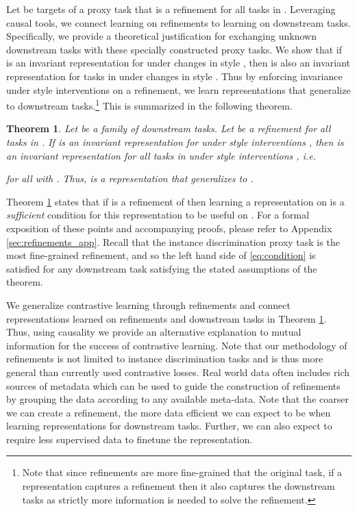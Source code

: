 \documentclass{article}
\newtheorem{theorem}{Theorem}
\begin{document}
Let  be targets of a proxy task that is a refinement for all tasks in .
Leveraging causal tools, we connect learning on refinements to learning on downstream tasks.
Specifically, we provide a theoretical justification for exchanging unknown downstream tasks with these specially constructed proxy tasks. 
We show that if  is an invariant representation for  under changes in style , then  is also an invariant representation for tasks in  under changes in style .
Thus by enforcing invariance under style interventions on a refinement, we learn representations that generalize to downstream tasks.\footnote{Note that since refinements are more fine-grained that the original task, if a representation captures a refinement then it also captures the downstream tasks as strictly more information is needed to solve the refinement.}
This is summarized in the following theorem. 
\begin{theorem}
    Let  be a family of downstream tasks. Let  be a refinement for all tasks in . 
    If  is an invariant representation for  under style interventions , then  is an invariant representation for all tasks in  under style interventions , i.e.
    
for all  with . Thus,  is a representation that generalizes to .
\label{thm.condition}
\end{theorem}

Theorem \ref{thm.condition} states that if  is a refinement of  then learning a representation on  is a \emph{sufficient} condition for this representation to be useful on . 
For a formal exposition of these points and accompanying proofs, please refer to Appendix \ref{sec:refinements_app}.
Recall that the instance discrimination proxy task is the most fine-grained refinement, and so the left hand side of \ref{eq:condition} is satisfied for any downstream task satisfying the stated assumptions of the theorem.

We generalize contrastive learning through refinements and connect representations learned on refinements and downstream tasks in Theorem \ref{thm.condition}. Thus, using causality we provide an alternative explanation to mutual information for the success of contrastive learning.
Note that our methodology of refinements is not limited to instance discrimination tasks and is thus more general than currently used contrastive losses. 
Real world data often includes rich sources of metadata which can be used to guide the construction of refinements
by grouping the data according to any available meta-data. 
Note that the coarser we can create a refinement, the more data efficient we can expect to be when learning representations for downstream tasks.
Further, we can also expect to require less supervised data to finetune the representation.
\end{document}
